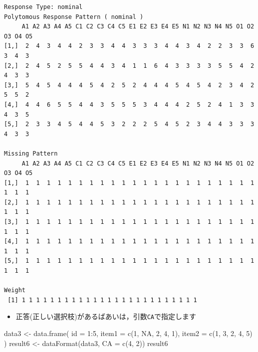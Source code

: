 \documentclass[
  a4paper,
]{ltjsbook}
\newenvironment{Shaded}{\begin{snugshade}}{\end{snugshade}}
\newcommand{\AttributeTok}[1]{\textcolor[rgb]{0.40,0.45,0.13}{#1}}
\newcommand{\ConstantTok}[1]{\textcolor[rgb]{0.56,0.35,0.01}{#1}}
\newcommand{\DecValTok}[1]{\textcolor[rgb]{0.68,0.00,0.00}{#1}}
\newcommand{\FunctionTok}[1]{\textcolor[rgb]{0.28,0.35,0.67}{#1}}
\newcommand{\NormalTok}[1]{\textcolor[rgb]{0.00,0.23,0.31}{#1}}
\newcommand{\OtherTok}[1]{\textcolor[rgb]{0.00,0.23,0.31}{#1}}
\newcommand{\SpecialCharTok}[1]{\textcolor[rgb]{0.37,0.37,0.37}{#1}}
\providecommand{\tightlist}{%
  \setlength{\itemsep}{0pt}\setlength{\parskip}{0pt}}\usepackage{longtable,booktabs,array}
\begin{document}
\begin{verbatim}
Response Type: nominal 
Polytomous Response Pattern ( nominal )
     A1 A2 A3 A4 A5 C1 C2 C3 C4 C5 E1 E2 E3 E4 E5 N1 N2 N3 N4 N5 O1 O2 O3 O4 O5
[1,]  2  4  3  4  4  2  3  3  4  4  3  3  3  4  4  3  4  2  2  3  3  6  3  4  3
[2,]  2  4  5  2  5  5  4  4  3  4  1  1  6  4  3  3  3  3  5  5  4  2  4  3  3
[3,]  5  4  5  4  4  4  5  4  2  5  2  4  4  4  5  4  5  4  2  3  4  2  5  5  2
[4,]  4  4  6  5  5  4  4  3  5  5  5  3  4  4  4  2  5  2  4  1  3  3  4  3  5
[5,]  2  3  3  4  5  4  4  5  3  2  2  2  5  4  5  2  3  4  4  3  3  3  4  3  3

Missing Pattern
     A1 A2 A3 A4 A5 C1 C2 C3 C4 C5 E1 E2 E3 E4 E5 N1 N2 N3 N4 N5 O1 O2 O3 O4 O5
[1,]  1  1  1  1  1  1  1  1  1  1  1  1  1  1  1  1  1  1  1  1  1  1  1  1  1
[2,]  1  1  1  1  1  1  1  1  1  1  1  1  1  1  1  1  1  1  1  1  1  1  1  1  1
[3,]  1  1  1  1  1  1  1  1  1  1  1  1  1  1  1  1  1  1  1  1  1  1  1  1  1
[4,]  1  1  1  1  1  1  1  1  1  1  1  1  1  1  1  1  1  1  1  1  1  1  1  1  1
[5,]  1  1  1  1  1  1  1  1  1  1  1  1  1  1  1  1  1  1  1  1  1  1  1  1  1

Weight
 [1] 1 1 1 1 1 1 1 1 1 1 1 1 1 1 1 1 1 1 1 1 1 1 1 1 1
\end{verbatim}

\begin{itemize}
\tightlist
\item
  正答(正しい選択枝)があるばあいは，引数\texttt{CA}で指定します
\end{itemize}

\begin{Shaded}
\begin{Highlighting}[]
\NormalTok{data3 }\OtherTok{\textless{}{-}} \FunctionTok{data.frame}\NormalTok{(}
    \AttributeTok{id =} \DecValTok{1}\SpecialCharTok{:}\DecValTok{5}\NormalTok{,}
    \AttributeTok{item1 =} \FunctionTok{c}\NormalTok{(}\DecValTok{1}\NormalTok{, }\ConstantTok{NA}\NormalTok{, }\DecValTok{2}\NormalTok{, }\DecValTok{4}\NormalTok{, }\DecValTok{1}\NormalTok{),}
    \AttributeTok{item2 =} \FunctionTok{c}\NormalTok{(}\DecValTok{1}\NormalTok{, }\DecValTok{3}\NormalTok{, }\DecValTok{2}\NormalTok{, }\DecValTok{4}\NormalTok{, }\DecValTok{5}\NormalTok{)}
\NormalTok{)}
\NormalTok{result6 }\OtherTok{\textless{}{-}} \FunctionTok{dataFormat}\NormalTok{(data3, }\AttributeTok{CA =} \FunctionTok{c}\NormalTok{(}\DecValTok{4}\NormalTok{, }\DecValTok{2}\NormalTok{))}
\NormalTok{result6}
\end{Highlighting}
\end{Shaded}
\end{document}
